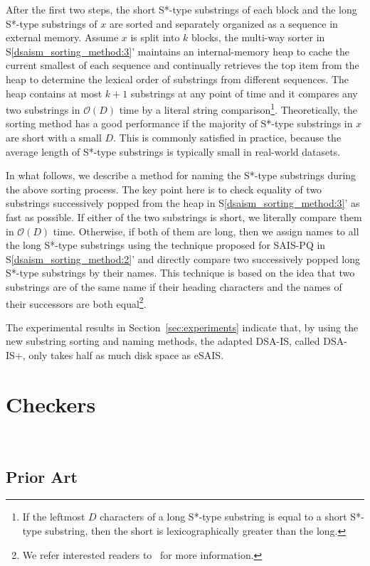 \documentclass[10pt,journal,compsoc]{IEEEtran}
\begin{document}
After the first two steps, the short S*-type substrings of each block and the long S*-type substrings of $x$ are sorted and separately organized as a sequence in external memory. Assume $x$ is split into $k$ blocks, the multi-way sorter in S\ref{dsaism_sorting_method:3}' maintains an internal-memory heap to cache the current smallest of each sequence and continually retrieves the top item from the heap to determine the lexical order of substrings from different sequences. The heap contains at most $k + 1$ substrings at any point of time and it compares any two substrings in $\mathcal{O}(D)$ time by a literal string comparison\footnote{If the leftmost $D$ characters of a long S*-type substring is equal to a short S*-type substring, then the short is lexicographically greater than the long.}. Theoretically, the sorting method has a good performance if the majority of S*-type substrings in $x$ are short with a small $D$. This is commonly satisfied in practice, because the average length of S*-type substrings is typically small in real-world datasets.

In what follows, we describe a method for naming the S*-type substrings during the above sorting process. The key point here is to check equality of two substrings successively popped from the heap in S\ref{dsaism_sorting_method:3}' as fast as possible. If either of the two substrings is short, we literally compare them in $\mathcal{O}(D)$ time. Otherwise, if both of them are long, then we assign names to all the long S*-type substrings using the technique proposed for SAIS-PQ in S\ref{dsaism_sorting_method:2}' and directly compare two successively popped long S*-type substrings by their names. This technique is based on the idea that two substrings are of the same name if their heading characters and the names of their successors are both equal\footnote{We refer interested readers to~\cite{Liu15} for more information.}.

The experimental results in Section~\ref{sec:experiments} indicate that, by using the new substring sorting and naming methods, the adapted DSA-IS, called DSA-IS+, only takes half as much disk space as eSAIS.

\section{Checkers}~\label{sec:checkers}

\subsection{Prior Art} \label{sec:checkers:prior_art}
\end{document}
